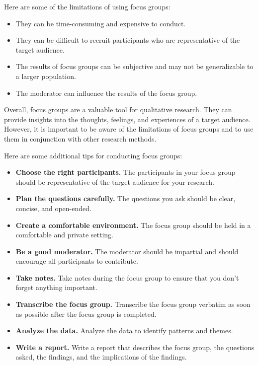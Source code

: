 \documentclass[
  b5paper]{book}
\begin{document}
Here are some of the limitations of using focus groups:

\begin{itemize}
\item
  They can be time-consuming and expensive to conduct.
\item
  They can be difficult to recruit participants who are representative of the target audience.
\item
  The results of focus groups can be subjective and may not be generalizable to a larger population.
\item
  The moderator can influence the results of the focus group.
\end{itemize}

Overall, focus groups are a valuable tool for qualitative research. They can provide insights into the thoughts, feelings, and experiences of a target audience. However, it is important to be aware of the limitations of focus groups and to use them in conjunction with other research methods.

Here are some additional tips for conducting focus groups:

\begin{itemize}
\item
  \textbf{Choose the right participants.} The participants in your focus group should be representative of the target audience for your research.
\item
  \textbf{Plan the questions carefully.} The questions you ask should be clear, concise, and open-ended.
\item
  \textbf{Create a comfortable environment.} The focus group should be held in a comfortable and private setting.
\item
  \textbf{Be a good moderator.} The moderator should be impartial and should encourage all participants to contribute.
\item
  \textbf{Take notes.} Take notes during the focus group to ensure that you don't forget anything important.
\item
  \textbf{Transcribe the focus group.} Transcribe the focus group verbatim as soon as possible after the focus group is completed.
\item
  \textbf{Analyze the data.} Analyze the data to identify patterns and themes.
\item
  \textbf{Write a report.} Write a report that describes the focus group, the questions asked, the findings, and the implications of the findings.
\end{itemize}
\end{document}
